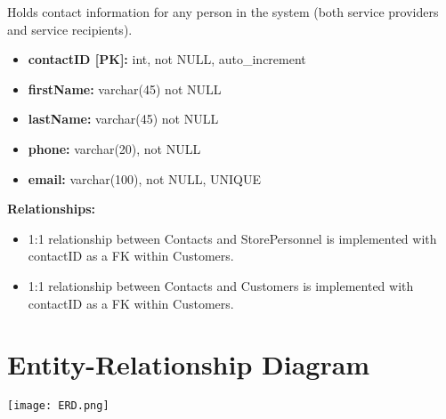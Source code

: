 \documentclass{article}
\begin{document}
\begin{tcolorbox}[colback=secondarycolor, colframe=primarycolor, title=\textbf{Contacts Table}]
Holds contact information for any person in the system (both service providers and service recipients).
 
 \vspace{0.2cm}

\begin{itemize}
  \item \textbf{contactID [PK]:} int, not NULL, auto\_increment
  \item \textbf{firstName:} varchar(45) not NULL
  \item \textbf{lastName:} varchar(45) not NULL
  \item \textbf{phone:} varchar(20), not NULL
  \item \textbf{email:} varchar(100), not NULL, UNIQUE
\end{itemize}
\vspace{0.2cm}

\textbf{Relationships:}
\vspace{0.2cm}
\begin{itemize}
   \item 1:1 relationship between Contacts and StorePersonnel is implemented with contactID as a FK within Customers.
   \item 1:1 relationship between Contacts and Customers is implemented with contactID as a FK within Customers.
\end{itemize}
\end{tcolorbox}

\vspace{0.5cm}

\section{Entity-Relationship Diagram}

\begin{tcolorbox}[colback=secondarycolor, colframe=primarycolor, arc=5mm]

\begin{center}
\vspace{0.5cm}
 \texttt{[image: ERD.png]}
\end{center}
\end{tcolorbox}
\end{document}
